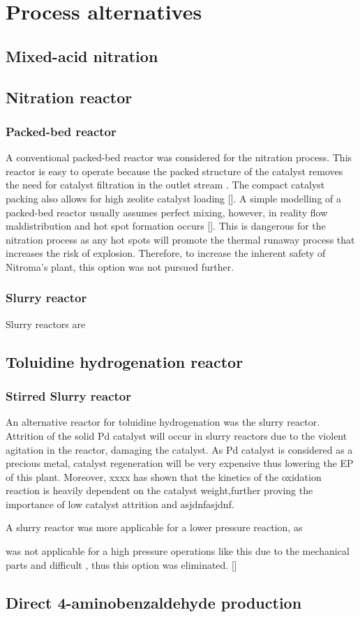 \section{Process alternatives}
\label{app:alternatives}

\subsection{Mixed-acid nitration}
\label{mixed}

\subsection{Nitration reactor}
\label{nitrationreactor}
\subsubsection{Packed-bed reactor}
A conventional packed-bed reactor was considered for the nitration process. This reactor is easy to operate because the packed structure of the catalyst removes the need for catalyst filtration in the outlet stream . The compact catalyst packing also allows for high zeolite catalyst loading []. A simple modelling of a packed-bed reactor usually assumes perfect mixing, however, in reality flow maldistribution and hot spot formation occurs []. This is dangerous for the nitration process as any hot spots will promote the thermal runaway process that increases the risk of explosion. Therefore, to increase the inherent safety of Nitroma's plant, this option was not pursued further.

\subsubsection{Slurry reactor}
Slurry reactors are
\subsection{Toluidine hydrogenation reactor}
\label{toluidine}
\subsubsection{Stirred Slurry reactor}
An alternative reactor for toluidine hydrogenation was the slurry reactor. Attrition of the solid Pd catalyst will occur in slurry reactors due to the violent agitation in the reactor, damaging the catalyst. As Pd catalyst is considered as a precious metal, catalyst regeneration will be very expensive thus lowering the EP of this plant. Moreover, xxxx has shown that the kinetics of the oxidation reaction is heavily dependent on the catalyst weight,further proving the importance of low catalyst attrition and asjdnfasjdnf. 

A slurry reactor was more applicable for a lower pressure reaction, as 

was not applicable for a high pressure operations like this due to the mechanical parts and difficult
, thus this option was eliminated. []


\subsection{Direct 4-aminobenzaldehyde production}
\label{direct}